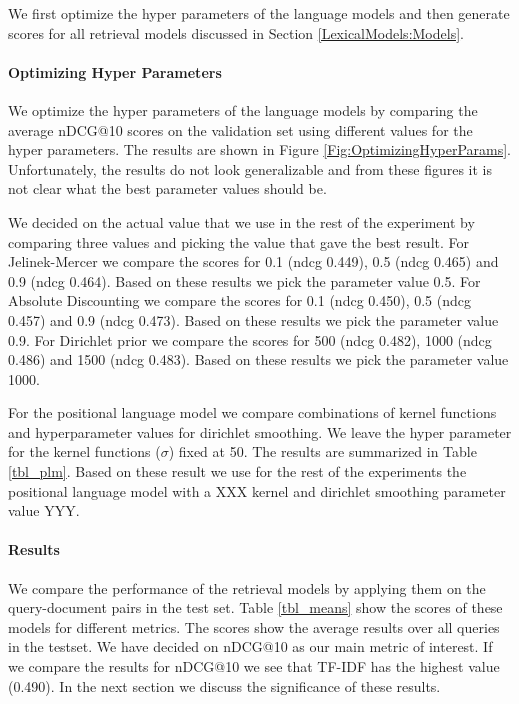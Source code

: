 We first optimize the hyper parameters of the 
language models and then generate scores for
all retrieval models discussed in 
Section \ref{LexicalModels:Models}.

\paragraph{Optimizing Hyper Parameters}

We optimize the hyper parameters of the language models
by comparing the average nDCG@10 scores on the validation set 
using different values for the hyper parameters.
The results are shown in Figure \ref{Fig:OptimizingHyperParams}.
Unfortunately, the results do not look generalizable and 
from these figures it is not clear what 
the best parameter values should be. 



We decided on the actual value that we use in the rest of the experiment
by comparing three values and picking the value that gave the best result.
%
For Jelinek-Mercer we compare the scores for 0.1 (ndcg 0.449),
0.5 (ndcg 0.465) and 0.9 (ndcg 0.464). Based on these results we pick
the parameter value 0.5. 
%
For Absolute Discounting we compare the scores for 0.1 (ndcg 0.450),
0.5 (ndcg 0.457) and 0.9 (ndcg 0.473). Based on these results we pick
the parameter value 0.9. 
%
For Dirichlet prior we compare the scores for 500 (ndcg 0.482),
1000 (ndcg 0.486) and 1500 (ndcg 0.483). Based on these results we pick
the parameter value 1000. 




For the positional language model we compare combinations of
kernel functions and hyperparameter values for dirichlet smoothing.
We leave the hyper parameter for the kernel functions ($\sigma$) fixed at 50.
The results are summarized in Table \ref{tbl_plm}.
Based on these result we use for the rest of the experiments
the positional language model with a XXX kernel and dirichlet smoothing parameter value YYY.



\paragraph{Results}

We compare the performance of the retrieval models by applying them on the query-document pairs in the test set. Table \ref{tbl_means} show the scores
of these models for different metrics. The scores show the average results
over all queries in the testset.
We have decided on nDCG@10 as our main metric of interest. If we
compare the results for nDCG@10 we see that TF-IDF has the highest
value (0.490). In the next section we discuss the significance 
of these results. 


